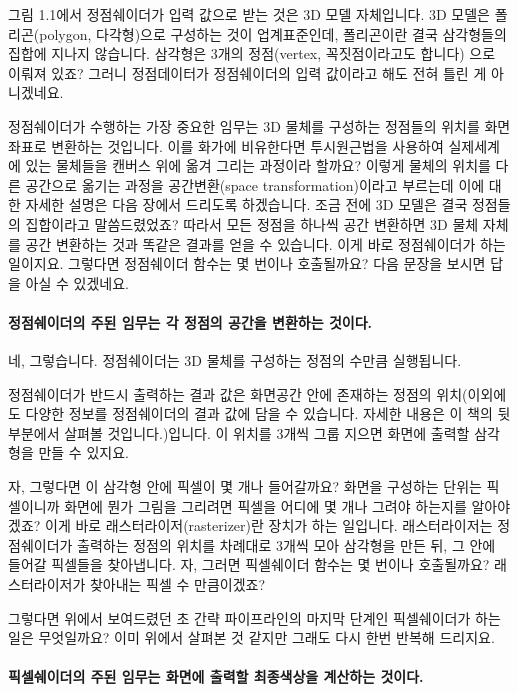 그림 1.1에서 정점쉐이더가 입력 값으로 받는 것은 3D 모델 자체입니다. 3D 모델은 폴리곤(polygon, 다각형)으로 구성하는 것이 업계표준인데, 폴리곤이란 결국 삼각형들의 집합에 지나지 않습니다. 삼각형은 3개의 정점(vertex, 꼭짓점이라고도 합니다) 으로 이뤄져 있죠? 그러니 정점데이터가 정점쉐이더의 입력 값이라고 해도 전혀 틀린 게 아니겠네요.

정점쉐이더가 수행하는 가장 중요한 임무는 3D 물체를 구성하는 정점들의 위치를 화면좌표로 변환하는 것입니다. 이를 화가에 비유한다면 투시원근법을 사용하여 실제세계에 있는 물체들을 캔버스 위에 옮겨 그리는 과정이라 할까요? 이렇게 물체의 위치를 다른 공간으로 옮기는 과정을 공간변환(space transformation)이라고 부르는데 이에 대한 자세한 설명은 다음 장에서 드리도록 하겠습니다. 조금 전에 3D 모델은 결국 정점들의 집합이라고 말씀드렸었죠? 따라서 모든 정점을 하나씩 공간 변환하면 3D 물체 자체를 공간 변환하는 것과 똑같은 결과를 얻을 수 있습니다. 이게 바로 정점쉐이더가 하는 일이지요. 그렇다면 정점쉐이더 함수는 몇 번이나 호출될까요? 다음 문장을 보시면 답을 아실 수 있겠네요.

\paragraph{정점쉐이더의 주된 임무는 각 정점의 공간을 변환하는 것이다.}

네, 그렇습니다. 정점쉐이더는 3D 물체를 구성하는 정점의 수만큼 실행됩니다.

정점쉐이더가 반드시 출력하는 결과 값은 화면공간 안에 존재하는 정점의 위치(이외에도 다양한 정보를 정점쉐이더의 결과 값에 담을 수 있습니다. 자세한 내용은 이 책의 뒷부분에서 살펴볼 것입니다.)입니다. 이 위치를 3개씩 그룹 지으면 화면에 출력할 삼각형을 만들 수 있지요.

자, 그렇다면 이 삼각형 안에 픽셀이 몇 개나 들어갈까요? 화면을 구성하는 단위는 픽셀이니까 화면에 뭔가 그림을 그리려면 픽셀을 어디에 몇 개나 그려야 하는지를 알아야겠죠? 이게 바로 래스터라이저(rasterizer)란 장치가 하는 일입니다. 래스터라이저는 정점쉐이더가 출력하는 정점의 위치를 차례대로 3개씩 모아 삼각형을 만든 뒤, 그 안에 들어갈 픽셀들을 찾아냅니다. 자, 그러면 픽셀쉐이더 함수는 몇 번이나 호출될까요? 래스터라이저가 찾아내는 픽셀 수 만큼이겠죠?

그렇다면 위에서 보여드렸던 초 간략 파이프라인의 마지막 단계인 픽셀쉐이더가 하는 일은 무엇일까요? 이미 위에서 살펴본 것 같지만 그래도 다시 한번 반복해 드리지요.

\paragraph{픽셀쉐이더의 주된 임무는 화면에 출력할 최종색상을 계산하는 것이다.}


